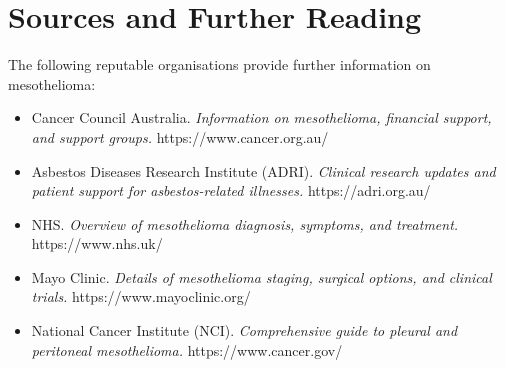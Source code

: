 \section*{Sources and Further Reading}
The following reputable organisations provide further information on mesothelioma:
\begin{itemize}
    \item Cancer Council Australia. \textit{Information on mesothelioma, financial support, and support groups.} https://www.cancer.org.au/
    \item Asbestos Diseases Research Institute (ADRI). \textit{Clinical research updates and patient support for asbestos-related illnesses.} https://adri.org.au/
    \item NHS. \textit{Overview of mesothelioma diagnosis, symptoms, and treatment.} https://www.nhs.uk/
    \item Mayo Clinic. \textit{Details of mesothelioma staging, surgical options, and clinical trials.} https://www.mayoclinic.org/
    \item National Cancer Institute (NCI). \textit{Comprehensive guide to pleural and peritoneal mesothelioma.} https://www.cancer.gov/
\end{itemize}
